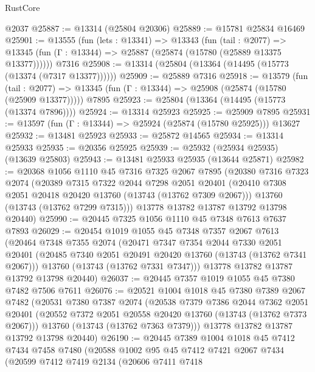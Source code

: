 \begin{lexlean}{RustCore}
\begin{coremodule}
    @2037
@25887 := @13314 (@25804 @20306)
@25889 := @15781 @25834 @16469
@25901 := @13555
    (fun (lets : @13341) =>
    @13343
      (fun (tail : @2077) =>
      @13345 (fun (Γ : @13344) => @25887 (@25874 (@15780 (@25889 @13375 @13377))))))
    @7316
@25908 := @13314 (@25804 (@13364 (@14495 (@15773 (@13374 (@7317 @13377))))))
@25909 := @25889 @7316
@25918 := @13579
    (fun (tail : @2077) => @13345 (fun (Γ : @13344) => @25908 (@25874 (@15780 (@25909 @13377)))))
    @7895
@25923 := @25804 (@13364 (@14495 (@15773 (@13374 @7896))))
@25924 := @13314 @25923
@25925 := @25909 @7895
@25931 := @13597 (fun (Γ : @13344) => @25924 (@25874 (@15780 @25925))) @13627
@25932 := @13481 @25923
@25933 := @25872 @14565
@25934 := @13314 @25933
@25935 := @20356 @25925
@25939 := @25932 (@25934 @25935) (@13639 @25803)
@25943 := @13481 @25933 @25935 (@13644 @25871)
@25982 := @20368
    @1056
    @1110
    @45
    @7316
    @7325
    @2067
    @7895
    (@20380
      @7316
      @7323
      @2074
      (@20389
        @7315
        @7322
        @2044
        @7298
        @2051
        @20401
        (@20410 @7308 @2051 @20418 @20420 @13760 (@13743 (@13762 @7309 @2067)))
        @13760
        (@13743 (@13762 @7299 @7315)))
      @13778
      @13782
      @13787
      @13792
      @13798
      @20440)
@25990 := @20445 @7325 @1056 @1110 @45 @7348 @7613 @7637 @7893
@26029 := @20454
    @1019
    @1055
    @45
    @7348
    @7357
    @2067
    @7613
    (@20464
      @7348
      @7355
      @2074
      (@20471
        @7347
        @7354
        @2044
        @7330
        @2051
        @20401
        (@20485 @7340 @2051 @20491 @20420 @13760 (@13743 (@13762 @7341 @2067)))
        @13760
        (@13743 (@13762 @7331 @7347)))
      @13778
      @13782
      @13787
      @13792
      @13798
      @20440)
@26037 := @20445 @7357 @1019 @1055 @45 @7380 @7482 @7506 @7611
@26076 := @20521
    @1004
    @1018
    @45
    @7380
    @7389
    @2067
    @7482
    (@20531
      @7380
      @7387
      @2074
      (@20538
        @7379
        @7386
        @2044
        @7362
        @2051
        @20401
        (@20552 @7372 @2051 @20558 @20420 @13760 (@13743 (@13762 @7373 @2067)))
        @13760
        (@13743 (@13762 @7363 @7379)))
      @13778
      @13782
      @13787
      @13792
      @13798
      @20440)
@26190 := @20445
    @7389
    @1004
    @1018
    @45
    @7412
    @7434
    @7458
    @7480
    (@20588
      @1002
      @95
      @45
      @7412
      @7421
      @2067
      @7434
      (@20599
        @7412
        @7419
        @2134
        (@20606
          @7411
          @7418

\end{coremodule}
\end{lexlean}
